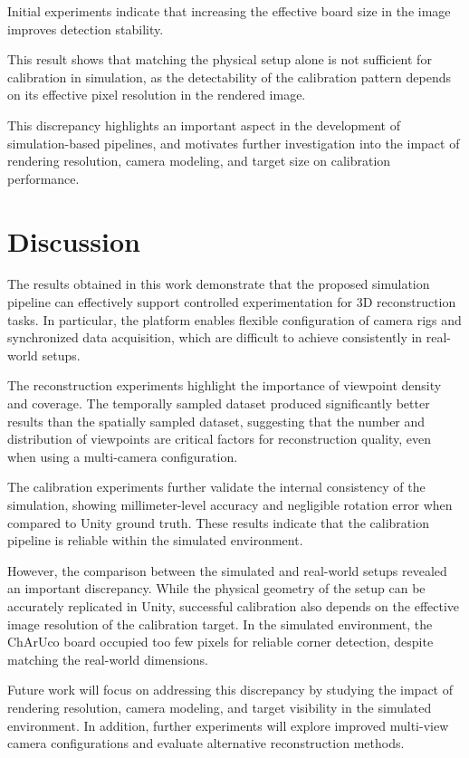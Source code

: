 \documentclass[conference]{IEEEtran}
\begin{document}
Initial experiments indicate that increasing the effective board size in the image improves detection stability.

This result shows that matching the physical setup alone is not sufficient for calibration in simulation, as the detectability of the calibration pattern depends on its effective pixel resolution in the rendered image.

This discrepancy highlights an important aspect in the development of simulation-based pipelines, and motivates further investigation into the impact of rendering resolution, camera modeling, and target size on calibration performance.


\section{Discussion}  

The results obtained in this work demonstrate that the proposed simulation pipeline can effectively support controlled experimentation for 3D reconstruction tasks. In particular, the platform enables flexible configuration of camera rigs and synchronized data acquisition, which are difficult to achieve consistently in real-world setups.

The reconstruction experiments highlight the importance of viewpoint density and coverage. The temporally sampled dataset produced significantly better results than the spatially sampled dataset, suggesting that the number and distribution of viewpoints are critical factors for reconstruction quality, even when using a multi-camera configuration.

The calibration experiments further validate the internal consistency of the simulation, showing millimeter-level accuracy and negligible rotation error when compared to Unity ground truth. These results indicate that the calibration pipeline is reliable within the simulated environment.

However, the comparison between the simulated and real-world setups revealed an important discrepancy. While the physical geometry of the setup can be accurately replicated in Unity, successful calibration also depends on the effective image resolution of the calibration target. In the simulated environment, the ChArUco board occupied too few pixels for reliable corner detection, despite matching the real-world dimensions.

Future work will focus on addressing this discrepancy by studying the impact of rendering resolution, camera modeling, and target visibility in the simulated environment. In addition, further experiments will explore improved multi-view camera configurations and evaluate alternative reconstruction methods.
\end{document}
